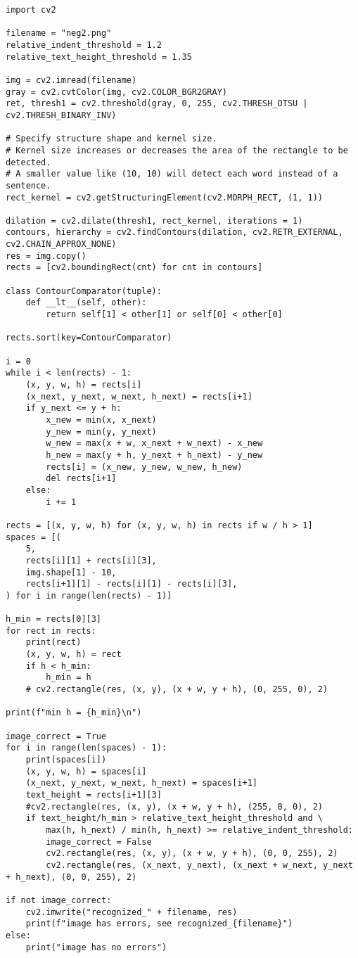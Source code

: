 \begin{lstlisting}[label=lst:1,caption= Сравнение алгоритмов кластеризации K-Means и K-Medoids]
import cv2

filename = "neg2.png"
relative_indent_threshold = 1.2
relative_text_height_threshold = 1.35

img = cv2.imread(filename)
gray = cv2.cvtColor(img, cv2.COLOR_BGR2GRAY)
ret, thresh1 = cv2.threshold(gray, 0, 255, cv2.THRESH_OTSU | cv2.THRESH_BINARY_INV)

# Specify structure shape and kernel size. 
# Kernel size increases or decreases the area of the rectangle to be detected.
# A smaller value like (10, 10) will detect each word instead of a sentence.
rect_kernel = cv2.getStructuringElement(cv2.MORPH_RECT, (1, 1))

dilation = cv2.dilate(thresh1, rect_kernel, iterations = 1)
contours, hierarchy = cv2.findContours(dilation, cv2.RETR_EXTERNAL, cv2.CHAIN_APPROX_NONE)
res = img.copy()
rects = [cv2.boundingRect(cnt) for cnt in contours]

class ContourComparator(tuple):
	def __lt__(self, other):
		return self[1] < other[1] or self[0] < other[0]

rects.sort(key=ContourComparator)

i = 0
while i < len(rects) - 1:
	(x, y, w, h) = rects[i]
	(x_next, y_next, w_next, h_next) = rects[i+1]
	if y_next <= y + h:
		x_new = min(x, x_next)
		y_new = min(y, y_next)
		w_new = max(x + w, x_next + w_next) - x_new
		h_new = max(y + h, y_next + h_next) - y_new
		rects[i] = (x_new, y_new, w_new, h_new)
		del rects[i+1]
	else:
		i += 1

rects = [(x, y, w, h) for (x, y, w, h) in rects if w / h > 1]
spaces = [(
	5, 
	rects[i][1] + rects[i][3], 
	img.shape[1] - 10, 
	rects[i+1][1] - rects[i][1] - rects[i][3],
) for i in range(len(rects) - 1)]

h_min = rects[0][3]
for rect in rects:
	print(rect)
	(x, y, w, h) = rect
	if h < h_min:
		h_min = h
	# cv2.rectangle(res, (x, y), (x + w, y + h), (0, 255, 0), 2)

print(f"min h = {h_min}\n")

image_correct = True
for i in range(len(spaces) - 1):
	print(spaces[i])
	(x, y, w, h) = spaces[i]
	(x_next, y_next, w_next, h_next) = spaces[i+1]
	text_height = rects[i+1][3]
	#cv2.rectangle(res, (x, y), (x + w, y + h), (255, 0, 0), 2)
	if text_height/h_min > relative_text_height_threshold and \
		max(h, h_next) / min(h, h_next) >= relative_indent_threshold:
		image_correct = False
		cv2.rectangle(res, (x, y), (x + w, y + h), (0, 0, 255), 2)
		cv2.rectangle(res, (x_next, y_next), (x_next + w_next, y_next + h_next), (0, 0, 255), 2)

if not image_correct:
	cv2.imwrite("recognized_" + filename, res)
	print(f"image has errors, see recognized_{filename}")
else:
	print("image has no errors")

\end{lstlisting}

\clearpage
